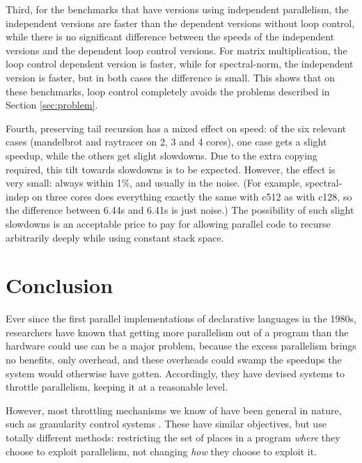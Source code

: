 Third, for the benchmarks that have versions using independent parallelism,
the independent versions are faster than
the dependent versions without loop control,
while there is no significant difference between
the speeds of the independent versions and the dependent loop control versions.
For matrix multiplication, the loop control dependent version is faster,
while for spectral-norm, the independent version is faster,
but in both cases the difference is small.
This shows that on these benchmarks, loop control completely avoids
the problems described in Section \ref{sec:problem}.

Fourth, preserving tail recursion has a mixed effect on speed:
of the six relevant cases (mandelbrot and raytracer on 2, 3 and 4 cores),
one case gets a slight speedup, while the others get slight slowdowns.
Due to the extra copying required,
this tilt towards slowdowns is to be expected.
However, the effect is very small:
always within 1\%, and usually in the noise.
(For example, spectral-indep on three cores
does everything exactly the same with c512 as with c128,
so the difference between 6.44s and 6.41s is just noise.)
The possibility of such slight slowdowns is an acceptable price to pay
for allowing parallel code to recurse arbitrarily deeply
while using constant stack space.

\section{Conclusion}
\label{sec:conc}

Ever since the first parallel implementations
of declarative languages in the 1980s,
researchers have known that getting more parallelism out of a program
than the hardware could use can be a major problem,
because the excess parallelism brings no benefits, only overhead,
and these overheads could swamp
the speedups the system would otherwise have gotten.
Accordingly, they have devised systems to throttle parallelism,
keeping it at a reasonable level.

However, most throttling mechanisms we know of
have been general in nature,
such as granularity control systems \cite{lopez96:distance_granularity}.
These have similar objectives,
but use totally different methods:
restricting the set of places in a program
\emph{where} they choose to exploit parallelism,
not changing \emph{how} they choose to exploit it.


